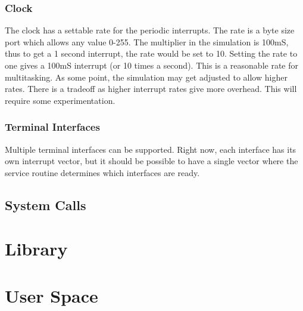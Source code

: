 \documentclass[10pt]{article}
\begin{document}
\subsubsection{Clock}
The clock has a settable rate for the periodic interrupts.  The rate is a byte size port which allows any value 0-255.  The multiplier in the simulation is 100mS, thus to get a 1 second interrupt, the rate would be set to 10.  Setting the rate to one gives a 100mS interrupt (or 10 times a second).  This is a reasonable rate for multitasking.  As some point, the simulation may get adjusted to allow higher rates.  There is a tradeoff as higher interrupt rates give more overhead.  This will require some experimentation.

\subsubsection{Terminal Interfaces}
Multiple terminal interfaces can be supported.  Right now, each interface has its own interrupt vector, but it should be possible to have a single vector where the service routine determines which interfaces are ready.

\subsection{System Calls}

\section{Library}

\section{User Space}
\end{document}

